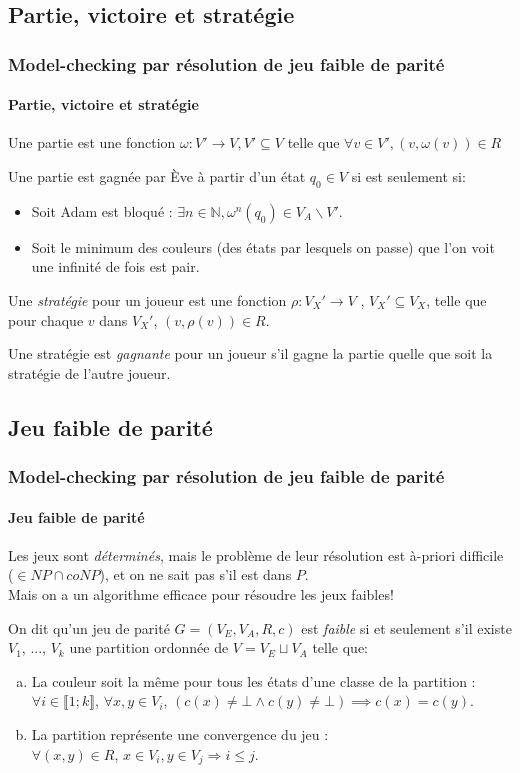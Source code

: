 \documentclass[11pt]{beamer}
\begin{document}
\subsection{Partie, victoire et stratégie}
\begin{frame}
    \frametitle{Model-checking par résolution de jeu faible de parité}
    \framesubtitle{Partie, victoire et stratégie}

    Une partie est une fonction $\omega : V' \to V, V' \subseteq V$ telle que $\forall v \in V', (v,\omega(v)) \in R$

    \pause
    \bigskip

    Une partie est gagnée par Ève à partir d'un état $q_0 \in V$ si est seulement si:
    \begin{itemize}
    \item Soit Adam est bloqué : $\exists n \in \mathbb{N}, \omega^n (q_0) \in V_A\backslash V'$.
    \item Soit le minimum des couleurs (des états par lesquels on passe) que l'on voit une infinité de fois est pair.
    \end{itemize}

    \pause
    \bigskip

	Une \emph{stratégie} pour un joueur est une fonction $\rho : V_X' \to V$ , $V_X' \subseteq V_X$, telle que pour chaque $v$ dans $V_X'$, $(v, \rho(v)) \in R$.

	\bigskip

    Une stratégie est \emph{gagnante} pour un joueur s'il gagne la partie quelle que soit la stratégie de l'autre joueur.
\end{frame}

\subsection{Jeu faible de parité}
\begin{frame}
    \frametitle{Model-checking par résolution de jeu faible de parité}
    \framesubtitle{Jeu faible de parité}

    Les jeux sont \emph{déterminés}, mais le problème de leur résolution est à-priori difficile ($\in NP \cap coNP$), et on ne sait pas s'il est dans $P$.\\
    Mais on a un algorithme efficace pour résoudre les jeux faibles!

    \pause
    \bigskip

    On dit qu'un jeu de parité $G = (V_E,V_A,R,c)$ est \emph{faible}  si et seulement s'il existe $V_1$, ..., $V_k$ une partition ordonnée de $V = V_E \sqcup V_A$ telle que:
    \begin{enumerate}[a)]
    \item La couleur soit la même pour tous les états d'une classe de la partition : $\forall i \in \llbracket 1 ; k \rrbracket$, $\forall x, y \in V_i$, $(c(x) \neq \bot \land c(y) \neq \bot)  \implies c(x) = c(y)$.
    \item La partition représente une convergence du jeu :\\
    $\forall (x, y) \in R$, $x\in V_i, y \in V_j \Rightarrow i \leq j$.
    \end{enumerate}
\end{frame}
\end{document}
